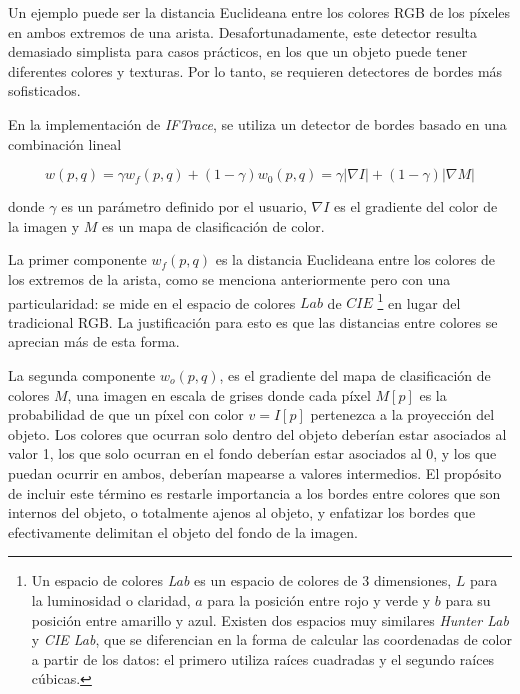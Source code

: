 \documentclass[a4paper,10pt]{article}
\begin{document}
Un ejemplo puede ser la distancia Euclideana entre los colores RGB de los píxeles
en ambos extremos de una arista. Desafortunadamente, este detector resulta demasiado
simplista para casos prácticos, en los que un objeto puede tener diferentes colores y
texturas. Por lo tanto, se requieren detectores de bordes más sofisticados.

En la implementación de \textit{IFTrace}, se utiliza un detector de bordes basado en
una combinación lineal

\begin{equation}
   \label{eq:IFTrace-edge-detector}
   w(p,q) = \gamma w_{f}(p,q) + (1 - \gamma)w_{0}(p,q) = \gamma |\nabla I| + (1 - \gamma)|\nabla M|
\end{equation}

donde $\gamma$ es un parámetro definido por el usuario, $\nabla I$ es el gradiente
del color de la imagen y $M$ es un mapa de clasificación de color.

La primer componente $w_{f}(p,q)$ es la distancia Euclideana entre los colores de
los extremos de la arista, como se menciona anteriormente pero con una particularidad:
se mide en el espacio de colores $Lab$ de $CIE$
\footnote{
Un espacio de colores \textit{Lab} es un espacio de colores de 3 dimensiones, $L$ para la luminosidad o claridad, $a$ para la posición entre rojo y verde y
$b$ para su posición entre amarillo y azul. Existen dos espacios muy similares \textit{Hunter Lab} y \textit{CIE Lab}, que se diferencian en la forma de
calcular las coordenadas de color a partir de los datos: el primero utiliza raíces cuadradas y el segundo raíces cúbicas.}
 en lugar del tradicional RGB. La
justificación para esto es que las distancias entre colores se aprecian más de
esta forma. %

La segunda componente $w_{o}(p,q)$, es el gradiente del mapa de clasificación
de colores $M$, una imagen en escala de grises donde cada píxel $M[p]$ es
la probabilidad de que un píxel con color $v=I[p]$ pertenezca a la proyección
del objeto. Los colores que ocurran solo dentro del objeto deberían estar
asociados al valor 1, los que solo ocurran en el fondo deberían estar
asociados al 0, y los que puedan ocurrir en ambos, deberían mapearse a
valores intermedios. El propósito de incluir este término es restarle
importancia a los bordes entre colores que son internos del objeto, o
totalmente ajenos al objeto, y enfatizar los bordes que efectivamente
delimitan el objeto del fondo de la imagen.
\end{document}
